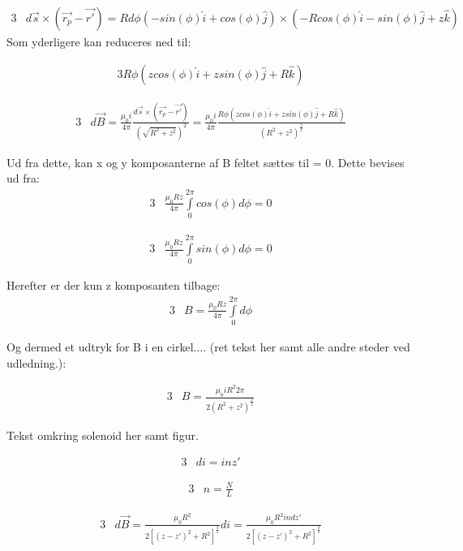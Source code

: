 	
\begin{alignat}{3}
	&d\vec{s}\times(\vec{r_p}-\vec{r'})=R d\phi (-sin(\phi)\hat{i}+cos(\phi)\hat{j})\times (-R cos(\phi)\hat{i}-sin(\phi)\hat{j}+z\hat{k})
\end{alignat}	
Som yderligere kan reduceres ned til:

\begin{alignat}{3}
	R \phi (z cos(\phi)\hat{i}+z sin(\phi)\hat{j}+R\hat{k})
\end{alignat}

\begin{alignat}{3}
	&d\vec{B}=\frac{\mu_0 i}{4\pi} \frac{d\vec{s}\times (\vec{r_p}-\vec{r'})}{(\sqrt{R^2+z^2})^2}=\frac{\mu_0 i}{4\pi} \frac{R \phi (z cos(\phi)\hat{i}+z sin(\phi)\hat{j}+R\hat{k})}{(R^2+z^2)^\frac{3}{2}}
\end{alignat}


Ud fra dette, kan x og y komposanterne af B feltet sættes til = 0. Dette bevises ud fra:
\begin{alignat}{3}
	&\frac{\mu_0 R z}{4\pi} \int\limits_{0}^{2\pi}cos(\phi)d\phi = 0
\end{alignat}


\begin{alignat}{3}
	&\frac{\mu_0 R z}{4\pi} \int\limits_{0}^{2\pi}sin(\phi)d\phi = 0
\end{alignat}

Herefter er der kun z komposanten tilbage:
\begin{alignat}{3}
	&B=\frac{\mu_0 R z}{4\pi} \int\limits_{0}^{2\pi}d\phi
\end{alignat}

Og dermed et udtryk for B i en cirkel.... (ret tekst her samt alle andre steder ved udledning.):


\begin{alignat}{3}
	&B=\frac{\mu_0 iR^2 2\pi}{2(R^2+z^2)^\frac{3}{2}}
\end{alignat}




Tekst omkring solenoid her samt figur.



\begin{alignat}{3}
	&di=inz'
\end{alignat}

\begin{alignat}{3}
	&n=\frac{N}{L}
\end{alignat}

\begin{alignat}{3}
	&d\vec{B}=\frac{\mu_0 R^2}{2[(z-z')^2+R^2]^\frac{3}{2}}di = \frac{\mu_0 R^2 i n dz'}{2[(z-z')^2+R^2]^\frac{3}{2}}
\end{alignat}


